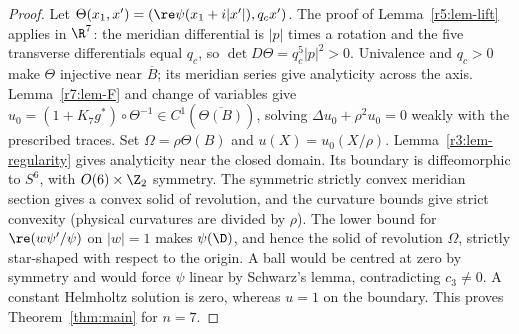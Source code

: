 \begin{proof}
Let $\Theta(x_1,x')=(\re\psi(x_1+i|x'|),q_cx')$. The proof of Lemma~\ref{r5:lem-lift} applies in $\R^7$: the meridian differential is $|p|$ times a rotation and the five transverse differentials equal $q_c$, so $\det D\Theta=q_c^5|p|^2>0$. Univalence and $q_c>0$ make $\Theta$ injective near $\overline B$; its meridian series give analyticity across the axis. Lemma~\ref{r7:lem-F} and change of variables give $u_0=(1+K_7g^*)\circ\Theta^{-1}\in C^1(\overline{\Theta(B)})$, solving $\Delta u_0+\rho^2u_0=0$ weakly with the prescribed traces. Set $\Omega=\rho\Theta(B)$ and $u(X)=u_0(X/\rho)$. Lemma~\ref{r3:lem-regularity} gives analyticity near the closed domain. Its boundary is diffeomorphic to $S^6$, with $O(6)\times\Z_2$ symmetry. The symmetric strictly convex meridian section gives a convex solid of revolution, and the curvature bounds give strict convexity (physical curvatures are divided by $\rho$). The lower bound for $\re(w\psi'/\psi)$ on $|w|=1$ makes $\psi(\D)$, and hence the solid of revolution $\Omega$, strictly star-shaped with respect to the origin. A ball would be centred at zero by symmetry and would force $\psi$ linear by Schwarz's lemma, contradicting $c_3\ne0$. A constant Helmholtz solution is zero, whereas $u=1$ on the boundary. This proves Theorem~\ref{thm:main} for $n=7$.
\end{proof}
